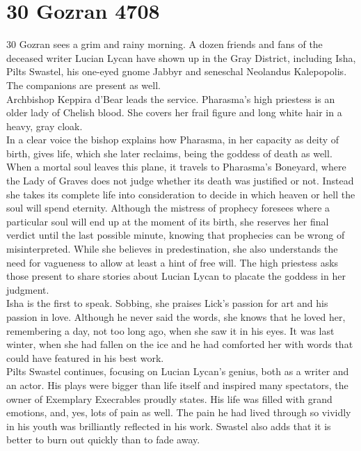 \section{30 Gozran 4708}

30 Gozran sees a grim and rainy morning. A dozen friends and fans of the deceased writer Lucian Lycan have shown up in the Gray District, including Isha, Pilts Swastel, his one-eyed gnome Jabbyr and seneschal Neolandus Kalepopolis. The companions are present as well.\\

Archbishop Keppira d'Bear leads the service. Pharasma's high priestess is an older lady of Chelish blood. She covers her frail figure and long white hair in a heavy, gray cloak.\\

In a clear voice the bishop explains how Pharasma, in her capacity as deity of birth, gives life, which she later reclaims, being the goddess of death as well. When a mortal soul leaves this plane, it travels to Pharasma's Boneyard, where the Lady of Graves does not judge whether its death was justified or not. Instead she takes its complete life into consideration to decide in which heaven or hell the soul will spend eternity. Although the mistress of prophecy foresees where a particular soul will end up at the moment of its birth, she reserves her final verdict until the last possible minute, knowing that prophecies can be wrong of misinterpreted. While she believes in predestination, she also understands the need for vagueness to allow at least a hint of free will. The high priestess asks those present to share stories about Lucian Lycan to placate the goddess in her judgment.\\

Isha is the first to speak. Sobbing, she praises Lick's passion for art and his passion in love. Although he never said the words, she knows that he loved her, remembering a day, not too long ago, when she saw it in his eyes. It was last winter, when she had fallen on the ice and he had comforted her with words that could have featured in his best work.\\

Pilts Swastel continues, focusing on Lucian Lycan's genius, both as a writer and an actor. His plays were bigger than life itself and inspired many spectators, the owner of Exemplary Execrables proudly states. His life was filled with grand emotions, and, yes, lots of pain as well. The pain he had lived through so vividly in his youth was brilliantly reflected in his work. Swastel also adds that it is better to burn out quickly than to fade away.\\

